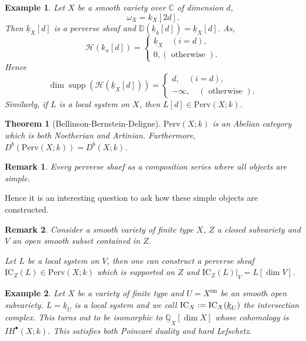 \documentclass[8pt]{article}
\numberwithin{equation}{section}
\newtheorem{theorem}{Theorem} [section]
\newtheorem{remark}{Remark}[section]
\newtheorem{example}{Example}[section]
\DeclareMathOperator{\supp}{supp}
\newcommand{\defeq}{\vcentcolon=}
\newcommand{\C}[0]{\mathbb{C}}
\newcommand{\Q}[0]{\mathbb{Q}}
\newcommand{\cH}[0]{\mathcal{H}}
\newcommand{\ul}[1]{\underline{#1}}
\newcommand{\otherwise}[0]{\text{ otherwise }}
\newcommand{\IC}[0]{\mathrm{IC}}
\newcommand{\Perv}[0]{\mathrm{Perv}}
\begin{document}
\begin{example}
    Let $X$ be a smooth variety over $\C$ of dimension $d$, 
    \begin{equation*}
        \omega_X = k_X[2d].
    \end{equation*}
    Then $\underline{k}_X[d]$ is a perverse sheaf and $\mathbb{D}(\underline{k}_k[d]) = \underline{k}_X[d]$.
    As,
    \begin{equation*}
        \cH(k_x[d]) = \begin{cases}
            \underline{k}_X \quad (i=d),\\
            0,(\otherwise).
        \end{cases}
    \end{equation*}
    Hence 
    \begin{equation*}
        \dim\supp(\cH(\underline{k}_X[d]))=\begin{cases}
            d,\quad(i=d),\\
            -\infty,\quad(\otherwise).
        \end{cases}
    \end{equation*}
    Similarly, if $L$ is a local system on $X$, then $L[d]\in\Perv(X;k)$.
\end{example}

\begin{theorem}[Bellinson-Bernstein-Deligne]
    $\Perv(X;k)$ is an Abelian category which is both Noetherian and Artinian.
    Furthermore, $D^b(\Perv(X;k)) = D^b(X;k)$.
\end{theorem}

\begin{remark}
    Every perverse shaef as a composition series where all objects are simple.
\end{remark}

Hence it is an interesting question to ask how these simple objects are constructed.

\begin{remark}
    Consider a smooth variety of finite type $X$, $Z$ a closed subvariety and $V$ an open smooth subset contained in $Z$.
    \par Let $L$ be a local system on $V$, then one can construct a perverse sheaf $\IC_Z(L)\in \Perv(X;k)$ which is supported on $Z$ and $\IC_Z(L)|_V = L[\dim V]$.
\end{remark}

\begin{example}
    Let $X$ be a variety of finite type and $U=X^{\mathrm{sm}}$ be an smooth open subvariety. $L = \ul{k}_U$ is a local system and we call $\IC_X\defeq \IC_X(\ul{k}_U)$ the intersection complex. This turns out to be isomorphic to $\ul{\Q}_X[\dim X]$ whose cohomology is $IH^\bullet(X;k)$. 
    This satisfies both Poincaré duality and hard Lefschetz.
\end{example}
\end{document}
